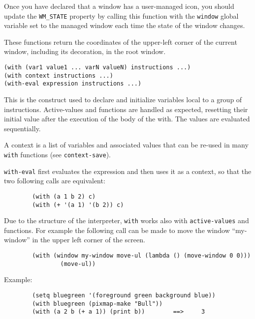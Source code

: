 Once you have declared that a window has a user-managed icon, you should
update the \verb"WM_STATE" property by calling this function with the
\verb"window" global variable set to the managed window each time the state
of the window changes.

        

These functions return the coordinates of the upper-left corner of the
current window, including its decoration, in the root window. 

        
{\usagefont\begin{verbatim}
(with (var1 value1 ... varN valueN) instructions ...)
(with context instructions ...)
(with-eval expression instructions ...)
\end{verbatim}}\usageupspace

This is the construct used to declare and initialize variables local to a
group of instructions. Active-values and functions are handled as expected,
resetting their initial value after the execution of the body of the with.
The values are evaluated sequentially.

A context is a list of variables and associated values that can be re-used
in many \verb"with" functions (see \verb"context-save").

\verb"with-eval" first evaluates the expression and then uses it as a
context, so that the two following calls are equivalent:

{\exemplefont\begin{verbatim}
        (with (a 1 b 2) c)
        (with (+ '(a 1) '(b 2)) c)
\end{verbatim}}

Due to the structure of the {\WOOL} interpreter, \verb"with" works also with
\verb"active-values" and functions. 
For example the following call can be made to
move the window ``my-window'' in the upper left corner of the screen.

{\exemplefont\begin{verbatim}
        (with (window my-window move-ul (lambda () (move-window 0 0)))
                (move-ul))
\end{verbatim}} 

Example: {\exemplefont\upspace\begin{verbatim}
        (setq bluegreen '(foreground green background blue))
        (with bluegreen (pixmap-make "Bull"))
        (with (a 2 b (+ a 1)) (print b))        ==>     3
\end{verbatim}}

